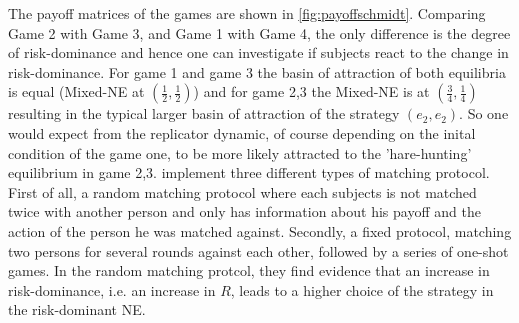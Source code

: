 \documentclass[12pt]{article}
\begin{document}
The payoff matrices of the games are shown in \ref{fig:payoffschmidt}.
Comparing Game 2 with Game 3, and Game 1 with Game 4, the only difference is the 
degree of risk-dominance and hence one can investigate if subjects react 
to the change in risk-dominance. For game 1 and game 3 the basin of attraction
of both equilibria is equal (Mixed-NE at $(\frac 12, \frac 12)$) and  for
game 2,3 the Mixed-NE is at $(\frac 34,\frac 14)$ resulting in the typical 
larger basin of attraction of the strategy $(e_2,e_2)$. So one would expect
from the replicator dynamic, of course depending on the inital condition 
of the game one, to be more likely attracted to the 'hare-hunting' equilibrium
in game 2,3.
\textcite{schmidt_playing_2003} implement three different types of matching
protocol. First of all, a random matching protocol where each subjects is not
matched twice with another person and only has information about his payoff and
the action of the person he was matched against. 
Secondly, a fixed protocol, matching two persons for several rounds against 
each other, followed by a series of one-shot games. 
In the random matching protcol, they find evidence that an increase in 
risk-dominance, i.e. an increase in $R$, leads to a higher choice of the
strategy in the risk-dominant NE. 
\end{document}
